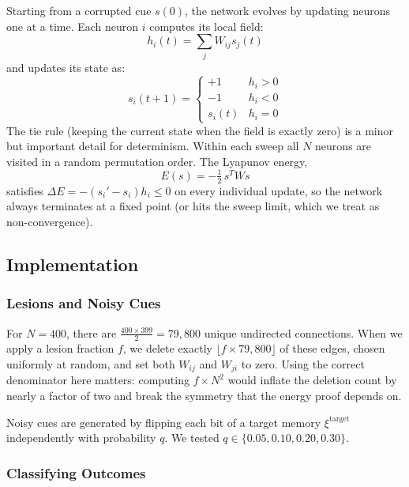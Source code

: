 \documentclass[11pt,a4paper]{article}
\begin{document}
Starting from a corrupted cue $s(0)$, the network evolves by updating neurons one at a time. Each neuron $i$ computes its local field:
\begin{equation}
h_i(t) = \sum_j W_{ij} s_j(t)
\end{equation}
and updates its state as:
\begin{equation}
s_i(t+1) = \begin{cases}
+1 & h_i > 0 \\
-1 & h_i < 0 \\
s_i(t) & h_i = 0
\end{cases}
\end{equation}
The tie rule (keeping the current state when the field is exactly zero) is a minor but important detail for determinism. Within each sweep all $N$ neurons are visited in a random permutation order. The Lyapunov energy,
\begin{equation}
E(s) = -\tfrac{1}{2}\, s^T W s
\end{equation}
satisfies $\Delta E = -(s_i' - s_i)h_i \leq 0$ on every individual update, so the network always terminates at a fixed point (or hits the sweep limit, which we treat as non-convergence).

\subsection{Implementation}

\subsubsection{Lesions and Noisy Cues}

For $N=400$, there are $\frac{400 \times 399}{2} = 79{,}800$ unique undirected connections. When we apply a lesion fraction $f$, we delete exactly $\lfloor f \times 79{,}800 \rfloor$ of these edges, chosen uniformly at random, and set both $W_{ij}$ and $W_{ji}$ to zero. Using the correct denominator here matters: computing $f \times N^2$ would inflate the deletion count by nearly a factor of two and break the symmetry that the energy proof depends on.

Noisy cues are generated by flipping each bit of a target memory $\xi^{\text{target}}$ independently with probability $q$. We tested $q \in \{0.05, 0.10, 0.20, 0.30\}$.

\subsubsection{Classifying Outcomes}
\end{document}
